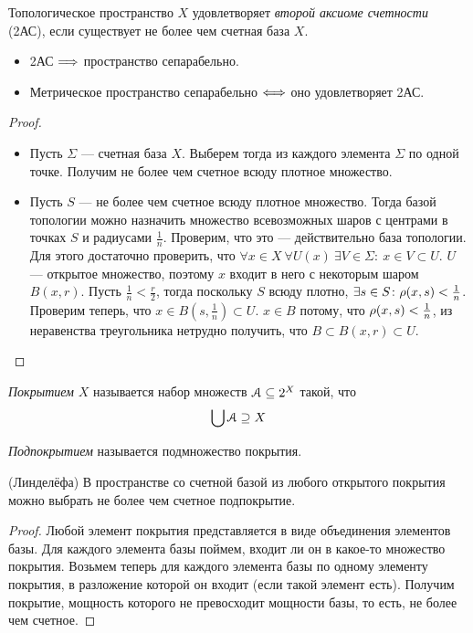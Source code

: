 \begin{definition}
	Топологическое пространство $X$ удовлетворяет \textit{второй аксиоме счетности} (2АС),
	если существует не более чем счетная база $X$.
\end{definition}

\begin{theorem}
	\enewline
	\begin{itemize}
		\item 2АС $\Longrightarrow$ пространство сепарабельно.
		\item Метрическое пространство сепарабельно $\Longleftrightarrow$ оно удовлетворяет 2АС.
	\end{itemize}
\end{theorem}
\begin{proof}
	\enewline
	\begin{itemize}
		\item Пусть $\Sigma$ --- счетная база $X$. Выберем тогда из каждого 
			элемента $\Sigma$ по одной точке. Получим не более чем счетное 
			всюду плотное множество.
		\item Пусть $S$ --- не более чем счетное всюду плотное множество.
			Тогда базой топологии можно назначить множество всевозможных
			шаров с центрами в точках $S$ и радиусами $\frac{1}{n}$. Проверим,
			что это --- действительно база топологии. Для этого достаточно проверить,
			что $\forall x \in X~\forall U(x)~\exists V\in \Sigma\colon~ x \in V \subset U$.
			$U$ --- открытое множество, поэтому $x$ входит в него с некоторым шаром 
			$B(x, r)$. Пусть $\frac{1}{n} < \frac{r}{2}$, тогда поскольку $S$ всюду плотно,
			$\exists s \in S\colon \rho(x, s) < \frac{1}{n}$. Проверим теперь, что
			$x \in B\left(s, \frac{1}{n}\right) \subset U$. $x \in B$ потому, что
			$\rho(x, s) < \frac{1}{n}$, из неравенства треугольника нетрудно
			получить, что $B \subset B(x, r) \subset U$.
	\end{itemize}	
\end{proof}

\begin{definition}
	\textit{Покрытием} $X$ называется набор множеств $\mathcal{A} \subseteq 2^X$ такой, что
\[
	\bigcup{\mathcal{A}} \supseteq X
\]
\end{definition}

\begin{definition}
	\textit{Подпокрытием} называется подмножество покрытия.
\end{definition}

\begin{theorem}(Линделёфа)
	В пространстве со счетной базой из любого открытого покрытия можно выбрать не более чем
	счетное подпокрытие.
\end{theorem}
\begin{proof}
	Любой элемент покрытия представляется в виде объединения элементов базы.
	Для каждого элемента базы поймем, входит ли он в какое-то множество покрытия.
	Возьмем теперь для каждого элемента базы по одному элементу покрытия,
	в разложение которой он входит (если такой элемент есть). Получим покрытие,
	мощность которого не превосходит мощности базы, то есть, не более чем счетное.
\end{proof}
